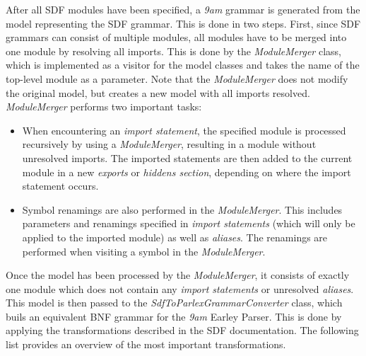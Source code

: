 \documentclass[article,linedtoc,colorback,accentcolor=tud4c,10pt]{tudreport}
\newcommand{\J}[1]{\textit{#1}}
\newcommand{\Jclass}[1]{\J{#1}}
\begin{document}
After all SDF modules have been specified, a \emph{9am} grammar is generated from the model representing the SDF grammar.
This is done in two steps. First, since SDF grammars can consist of multiple modules, all modules have to be merged into one module by resolving all imports. This is done by the \Jclass{ModuleMerger} class, which is implemented as a visitor for the model classes and takes the name of the top-level module as a parameter. Note that the \Jclass{ModuleMerger} does not modify the original model, but creates a new model with all imports resolved.
\Jclass{ModuleMerger} performs two important tasks:

\begin{itemize}
\item When encountering an \emph{import statement}, the specified module is processed recursively by using a \Jclass{ModuleMerger}, resulting in a module without unresolved imports. The imported statements are then added to the current module in a new \emph{exports} or \emph{hiddens section}, depending on where the import statement occurs.
\item Symbol renamings are also performed in the \Jclass{ModuleMerger}. This includes parameters and renamings specified in \emph{import statements} (which will only be applied to the imported module) as well as \emph{aliases}. The renamings are performed when visiting a symbol in the \Jclass{ModuleMerger}.
\end{itemize}

Once the model has been processed by the \Jclass{ModuleMerger}, it consists of exactly one module which does not contain any \emph{import statements} or unresolved \emph{aliases}. This model is then passed to the \Jclass{SdfToParlexGrammarConverter} class, which buils an equivalent BNF grammar for the \emph{9am} Earley Parser. This is done by applying the transformations described in the SDF documentation. The following list provides an overview of the most important transformations.
\end{document}
